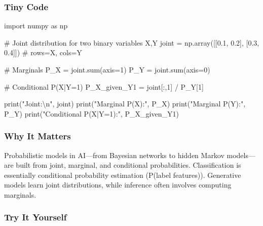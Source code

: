 \documentclass[
  letterpaper,
  DIV=11,
  numbers=noendperiod]{scrreprt}
\newenvironment{Shaded}{\begin{snugshade}}{\end{snugshade}}
\newcommand{\BuiltInTok}[1]{\textcolor[rgb]{0.00,0.23,0.31}{#1}}
\newcommand{\CharTok}[1]{\textcolor[rgb]{0.13,0.47,0.30}{#1}}
\newcommand{\CommentTok}[1]{\textcolor[rgb]{0.37,0.37,0.37}{#1}}
\newcommand{\DecValTok}[1]{\textcolor[rgb]{0.68,0.00,0.00}{#1}}
\newcommand{\FloatTok}[1]{\textcolor[rgb]{0.68,0.00,0.00}{#1}}
\newcommand{\ImportTok}[1]{\textcolor[rgb]{0.00,0.46,0.62}{#1}}
\newcommand{\NormalTok}[1]{\textcolor[rgb]{0.00,0.23,0.31}{#1}}
\newcommand{\OperatorTok}[1]{\textcolor[rgb]{0.37,0.37,0.37}{#1}}
\newcommand{\StringTok}[1]{\textcolor[rgb]{0.13,0.47,0.30}{#1}}
\begin{document}
\subsubsection{Tiny Code}\label{tiny-code-124}

\begin{Shaded}
\begin{Highlighting}[]
\ImportTok{import}\NormalTok{ numpy }\ImportTok{as}\NormalTok{ np}

\CommentTok{\# Joint distribution for two binary variables X,Y}
\NormalTok{joint }\OperatorTok{=}\NormalTok{ np.array([[}\FloatTok{0.1}\NormalTok{, }\FloatTok{0.2}\NormalTok{],}
\NormalTok{                  [}\FloatTok{0.3}\NormalTok{, }\FloatTok{0.4}\NormalTok{]])  }\CommentTok{\# rows=X, cols=Y}

\CommentTok{\# Marginals}
\NormalTok{P\_X }\OperatorTok{=}\NormalTok{ joint.}\BuiltInTok{sum}\NormalTok{(axis}\OperatorTok{=}\DecValTok{1}\NormalTok{)}
\NormalTok{P\_Y }\OperatorTok{=}\NormalTok{ joint.}\BuiltInTok{sum}\NormalTok{(axis}\OperatorTok{=}\DecValTok{0}\NormalTok{)}

\CommentTok{\# Conditional P(X|Y=1)}
\NormalTok{P\_X\_given\_Y1 }\OperatorTok{=}\NormalTok{ joint[:,}\DecValTok{1}\NormalTok{] }\OperatorTok{/}\NormalTok{ P\_Y[}\DecValTok{1}\NormalTok{]}

\BuiltInTok{print}\NormalTok{(}\StringTok{"Joint:}\CharTok{\textbackslash{}n}\StringTok{"}\NormalTok{, joint)}
\BuiltInTok{print}\NormalTok{(}\StringTok{"Marginal P(X):"}\NormalTok{, P\_X)}
\BuiltInTok{print}\NormalTok{(}\StringTok{"Marginal P(Y):"}\NormalTok{, P\_Y)}
\BuiltInTok{print}\NormalTok{(}\StringTok{"Conditional P(X|Y=1):"}\NormalTok{, P\_X\_given\_Y1)}
\end{Highlighting}
\end{Shaded}

\subsubsection{Why It Matters}\label{why-it-matters-22}

Probabilistic models in AI---from Bayesian networks to hidden Markov
models---are built from joint, marginal, and conditional probabilities.
Classification is essentially conditional probability estimation
(P(label \textbar{} features)). Generative models learn joint
distributions, while inference often involves computing marginals.

\subsubsection{Try It Yourself}\label{try-it-yourself-124}
\end{document}
